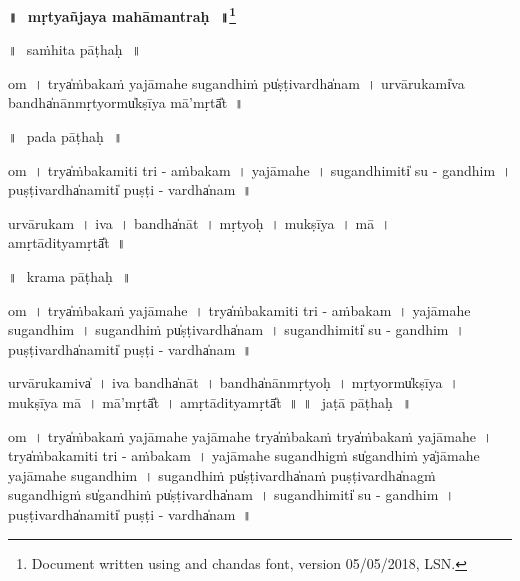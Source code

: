 \documentclass[parskip, DIV=14]{scrartcl}
\renewcommand{\thefootnote}{\fnsymbol{footnote}} %
\begin{document}

\vspace{-1.5cm}

\begin{center}
\textbf{{\Huge॥\,~mṛtyañjaya mahāmantraḥ\,~॥\LARGE\let\thefootnote\relax\footnote{\color{lightgray} Document written using \XeLaTeX{} and chandas font,  version 05/05/2018, LSN.}}}
\end{center}
\Large

{\centering	


॥\,~saṁhita pāṭhaḥ\,~॥\\
\vspace{0.5cm}

om~। trya̍ṁbakaṁ yajāmahe suga॒ndhiṁ pu̍ṣṭi॒vardha̍nam~। u॒rvā॒ru॒kami̍va॒ bandha̍nānmṛ॒tyormu̍kṣīya॒ mā'mṛtā̎t~॥

\vspace{1.0cm}

॥\,~pada pāṭhaḥ\,~॥\\
\vspace{0.5cm}

om~। 
trya̍ṁbaka॒miti॒ tri - a॒ṁba॒ka॒m~।
ya॒jā॒ma॒he॒~।
su॒ga॒ndhimiti̍ su - ga॒ndhim~। pu॒ṣṭi॒vardha̍na॒miti̍ puṣṭi - vardha̍nam~॥ 

u॒rvā॒ru॒kam~।
i॒va॒~।
bandha̍nāt~।
mṛ॒tyoḥ~।
mu॒kṣī॒ya॒~।
mā~।
a॒mṛtā॒ditya॒mṛtā̎t~॥

\vspace{1cm}

॥\,~krama pāṭhaḥ\,~॥\\
\vspace{0.5cm}

om~।
trya̍ṁbakaṁ yajāmahe~।
trya̍ṁbaka॒miti॒ tri - a॒ṁba॒ka॒m~।
ya॒jā॒ma॒he॒ su॒ga॒ndhim~।
su॒ga॒ndhiṁ pu̍ṣṭi॒vardha̍nam~। su॒ga॒ndhimiti̍ su - ga॒ndhim~। pu॒ṣṭi॒vardha̍na॒miti̍ puṣṭi - vardha̍nam~॥ 

u॒rvā॒ru॒kamiva̍~।
i॒va॒ bandha̍nāt~।
bandha̍nānmṛ॒tyoḥ~।
mṛ॒tyormu̍kṣīya~।
mu॒kṣī॒ya॒ mā~।
mā'mṛtā̎t~।
a॒mṛtā॒ditya॒mṛtā̎t~॥
\newpage
॥\,~jaṭā pāṭhaḥ\,~॥\\
\vspace{0.5cm}

om~।
trya̍ṁbakaṁ yajāmahe yajāmahe॒ trya̍ṁbaka॒ṁ
trya̍ṁbakaṁ yajāmahe~।
trya̍ṁbaka॒miti॒ tri - a॒ṁba॒ka॒m~।
ya॒jā॒ma॒he॒ su॒ga॒ndhigṁ su̍ga॒ndhiṁ ya̍jāmahe yajāmahe
suga॒ndhim~।
su॒ga॒ndhiṁ pu̍ṣṭi॒vardha̍naṁ puṣṭi॒vardha̍nagṁ
suga॒ndhigṁ su̍ga॒ndhiṁ pu̍ṣṭi॒vardha̍nam~।
su॒ga॒ndhimiti̍ su - ga॒ndhim~।
pu॒ṣṭi॒vardha̍na॒miti̍ puṣṭi - vardha̍nam~॥ 

}
\end{document}
